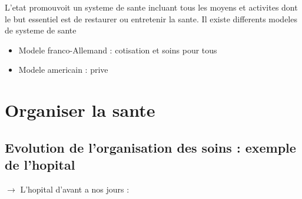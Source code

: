 \documentclass{article}
\begin{document}
L'etat promouvoit un systeme de sante incluant tous les moyens et activites dont le but essentiel est de restaurer ou entretenir la sante.
\newline\newline
Il existe differents modeles de systeme de sante
\begin{itemize}[label=\textbullet]
	\item Modele franco-Allemand : cotisation et soins pour tous
	\item Modele americain : prive
\end{itemize}

\section{Organiser la sante}
\subsection{Evolution de l'organisation des soins : exemple de l'hopital}

$\rightarrow$ L'hopital d'avant a nos jours :\newline
\end{document}
